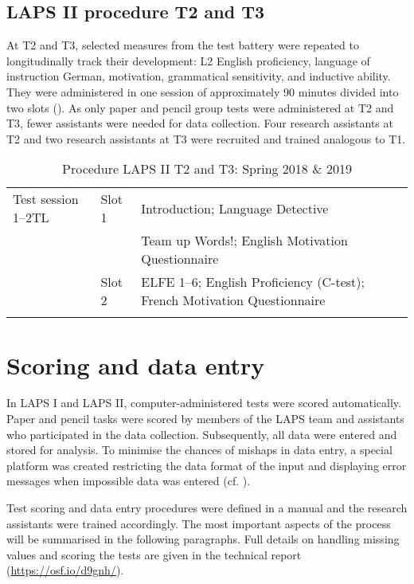 \documentclass[output=paper]{langsci/langscibook}
\begin{document}
 \subsection{LAPS II procedure T2 and T3}


At T2 and T3, selected measures from the test battery were repeated to longitudinally track their development: L2 English proficiency, language of instruction German, motivation, grammatical sensitivity, and inductive ability. They were administered in one session of approximately 90 minutes divided into two slots (). As only paper and pencil group tests were administered at T2 and T3, fewer assistants were needed for data collection. Four research assistants at T2 and two research assistants at T3 were recruited and trained analogous to T1.


\begin{table}
\begin{tabularx}{\textwidth}{llQ}
\lsptoprule
Test session 1--2TL & Slot 1 & Introduction; Language Detective\\
                   &  & Team up Words!; English Motivation Questionnaire\\
                   & Slot 2 & ELFE 1--6; English Proficiency (C-test); French Motivation Questionnaire\\
\lspbottomrule
\end{tabularx}
\caption{Procedure LAPS II T2 and T3: Spring 2018 \& 2019\label{tab:02:7}}
\end{table}

\section{Scoring and data entry}

In LAPS I and LAPS II, computer-administered tests were scored automatically. Paper and pencil tasks were scored by members of the LAPS team and assistants who participated in the data collection. Subsequently, all data were entered and stored for analysis. To minimise the chances of mishaps in data entry, a special platform was created restricting the data format of the input and displaying error messages when impossible data was entered (cf. \citealt{Vanhove2018}). 

Test scoring and data entry procedures were defined in a manual and the research assistants were trained accordingly. The most important aspects of the process will be summarised in the following paragraphs. Full details on handling missing values and scoring the tests are given in the technical report (\url{https://osf.io/d9gnh/}).
\end{document}
